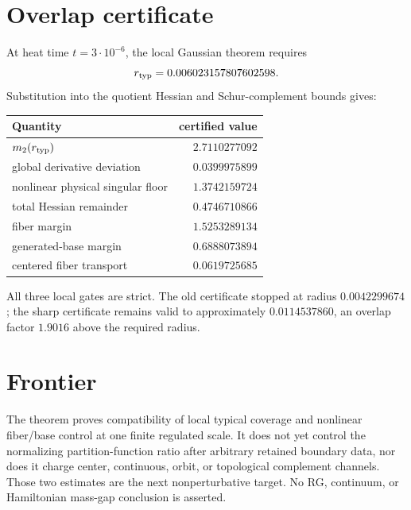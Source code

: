 \documentclass[11pt]{article}
\begin{document}
\section{Overlap certificate}
At heat time $t=3\cdot10^{-6}$, the local Gaussian theorem requires
\[
 r_{\rm typ}=0.006023157807602598.
\]
Substitution into the quotient Hessian and Schur-complement bounds gives:

\begin{center}
\begin{tabular}{lr}
\toprule
Quantity & certified value\\
\midrule
$m_2(r_{\rm typ})$ & $2.7110277092$\\
global derivative deviation & $0.0399975899$\\
nonlinear physical singular floor & $1.3742159724$\\
total Hessian remainder & $0.4746710866$\\
fiber margin & $1.5253289134$\\
generated-base margin & $0.6888073894$\\
centered fiber transport & $0.0619725685$\\
\bottomrule
\end{tabular}
\end{center}

All three local gates are strict.  The old certificate stopped at radius
$0.0042299674$; the sharp certificate remains valid to approximately
$0.0114537860$, an overlap factor $1.9016$ above the required radius.

\section{Frontier}
The theorem proves compatibility of local typical coverage and nonlinear
fiber/base control at one finite regulated scale.  It does not yet control the
normalizing partition-function ratio after arbitrary retained boundary data,
nor does it charge center, continuous, orbit, or topological complement
channels.  Those two estimates are the next nonperturbative target.  No RG,
continuum, or Hamiltonian mass-gap conclusion is asserted.
\end{document}
